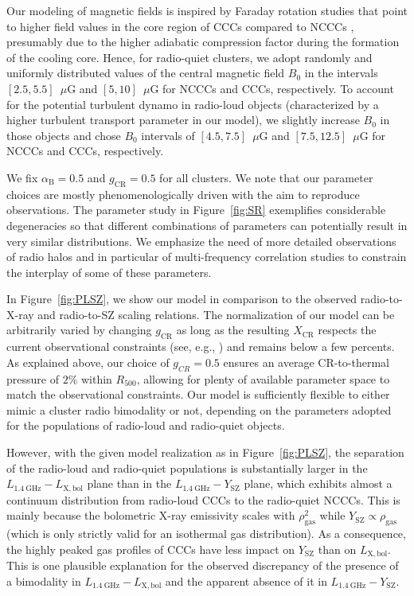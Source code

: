\documentclass[traditabstract]{aa}
\newcommand{\rmn}{\mathrm}
\begin{document}
Our modeling of magnetic fields is inspired by Faraday rotation studies that
point to higher field values in the core region of CCCs compared to NCCCs
\citep{2011A&A...529A..13K, 2010A&A...513A..30B}, presumably due to the higher
adiabatic compression factor during the formation of the cooling core. Hence,
for radio-quiet clusters, we adopt randomly and uniformly distributed values of
the central magnetic field $B_0$ in the intervals $[2.5,5.5]$~$\mu$G and
$[5,10]$~$\mu$G for NCCCs and CCCs, respectively. To account for the potential
turbulent dynamo in radio-loud objects (characterized by a higher turbulent
transport parameter in our model), we slightly increase $B_0$ in those objects
and chose $B_0$ intervals of $[4.5,7.5]$~$\mu$G and $[7.5,12.5]$~$\mu$G for
NCCCs and CCCs, respectively.

We fix $\alpha_{\rmn{B}}=0.5$ and $g_{\rmn{CR}}=0.5$ for all clusters. We note
that our parameter choices are mostly phenomenologically driven with the aim to
reproduce observations. The parameter study in Figure~\ref{fig:SR} exemplifies
considerable degeneracies so that different combinations of parameters can
potentially result in very similar distributions. We emphasize the need of more
detailed observations of radio halos and in particular of multi-frequency
correlation studies to constrain the interplay of some of these parameters.

In Figure~\ref{fig:PLSZ}, we show our model in comparison to the observed
radio-to-X-ray and radio-to-SZ scaling relations. The normalization of our model
can be arbitrarily varied by changing $g_{\rmn{CR}}$ as long as the resulting
$X_{\rmn{CR}}$ respects the current observational constraints
(see, e.g., \citealp{2011arXiv1111.5544M}) and remains below a few percents. As
explained above, our choice of $g_{CR}=0.5$ ensures an average CR-to-thermal
pressure of $2\%$ within $R_{500}$, allowing for plenty of available parameter
space to match the observational constraints.  Our model is sufficiently
flexible to either mimic a cluster radio bimodality or not, depending on the
parameters adopted for the populations of radio-loud and radio-quiet
objects. 

However, with the given model realization as in Figure~\ref{fig:PLSZ}, the
separation of the radio-loud and radio-quiet populations is substantially larger in
the $L_{1.4~\rmn{GHz}}-L_{\rmn{X,bol}}$ plane than in the
$L_{1.4~\rmn{GHz}}-Y_{\rmn{SZ}}$ plane, which exhibits almost a continuum
distribution from radio-loud CCCs to the radio-quiet NCCCs. This is mainly
because the bolometric X-ray emissivity scales with $\rho_{\rmn{gas}}^2$ while
$Y_{\rmn{SZ}}\propto\rho_{\rmn{gas}}$ (which is only strictly valid for an
isothermal gas distribution). As a consequence, the highly peaked gas profiles
of CCCs have less impact on $Y_{\rmn{SZ}}$ than on $L_{\rmn{X,bol}}$. This is
one plausible explanation for the observed discrepancy of the presence of a
bimodality in $L_{1.4~\rmn{GHz}}-L_{\rmn{X,bol}}$ and the apparent absence of it
in $L_{1.4~\rmn{GHz}}-Y_{\rmn{SZ}}$. 
\end{document}
